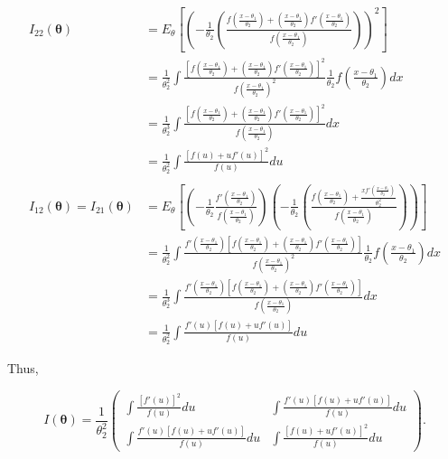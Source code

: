 \documentclass[12pt,]{article}
\begin{document}
\begin{align*}
I_{22}(\boldsymbol\theta)& =E_\theta\left[\left(-\frac{1}{\theta_2}\left(\frac{f\left(\frac{x-\theta_1}{\theta_2}\right)+\left(\frac{x-\theta_1}{\theta_2}\right)f'\left(\frac{x-\theta_1}{\theta_2}\right)}{f\left(\frac{x-\theta_1}{\theta_2}\right)}\right)\right)^2\right]\\
& =\frac{1}{\theta_2^2}\int\frac{\left[f\left(\frac{x-\theta_1}{\theta_2}\right)+\left(\frac{x-\theta_1}{\theta_2}\right)f'\left(\frac{x-\theta_1}{\theta_2}\right)\right]^2}{f\left(\frac{x-\theta_1}{\theta_2}\right)^2}\frac{1}{\theta_2}f\left(\frac{x-\theta_1}{\theta_2}\right)dx\\
& =\frac{1}{\theta_2^3}\int\frac{\left[f\left(\frac{x-\theta_1}{\theta_2}\right)+\left(\frac{x-\theta_1}{\theta_2}\right)f'\left(\frac{x-\theta_1}{\theta_2}\right)\right]^2}{f\left(\frac{x-\theta_1}{\theta_2}\right)}dx\\
& =\frac{1}{\theta_2^2}\int\frac{[f(u)+uf'(u)]^2}{f(u)}du\\
\\
I_{12}(\boldsymbol\theta)=I_{21}(\boldsymbol\theta)&=E_\theta\left[\left(-\frac{1}{\theta_2}\frac{f'\left(\frac{x-\theta_1}{\theta_2}\right)}{f\left(\frac{x-\theta_1}{\theta_2}\right)}\right)\left(-\frac{1}{\theta_2}\left(\frac{f\left(\frac{x-\theta_1}{\theta_2}\right)+\frac{xf'\left(\frac{x-\theta_1}{\theta_2}\right)}{\theta_2^2}}{f\left(\frac{x-\theta_1}{\theta_2}\right)}\right)\right)\right]\\
&=\frac{1}{\theta_2^2}\int\frac{f'\left(\frac{x-\theta_1}{\theta_2}\right)\left[f\left(\frac{x-\theta_1}{\theta_2}\right)+\left(\frac{x-\theta_1}{\theta_2}\right)f'\left(\frac{x-\theta_1}{\theta_2}\right)\right]}{f\left(\frac{x-\theta_1}{\theta_2}\right)^2}\frac{1}{\theta_2}f\left(\frac{x-\theta_1}{\theta_2}\right)dx\\
&=\frac{1}{\theta_2^3}\int\frac{f'\left(\frac{x-\theta_1}{\theta_2}\right)\left[f\left(\frac{x-\theta_1}{\theta_2}\right)+\left(\frac{x-\theta_1}{\theta_2}\right)f'\left(\frac{x-\theta_1}{\theta_2}\right)\right]}{f\left(\frac{x-\theta_1}{\theta_2}\right)}dx\\
&=\frac{1}{\theta_2^2}\int\frac{f'(u)[f(u)+uf'(u)]}{f(u)}du
\end{align*}

Thus,

\[I(\boldsymbol\theta)=\frac{1}{\theta_2^2}\begin{pmatrix}
\int\frac{[f'(u)]^2}{f(u)}du & \int\frac{f'(u)[f(u)+uf'(u)]}{f(u)}du\\
\int\frac{f'(u)[f(u)+uf'(u)]}{f(u)}du &\int\frac{[f(u)+uf'(u)]^2}{f(u)}du
\end{pmatrix}.\]
\end{document}
